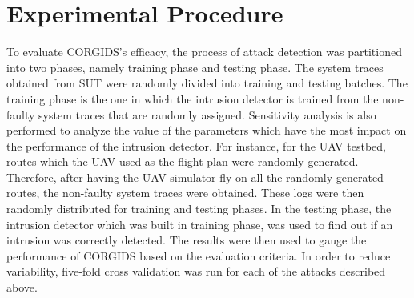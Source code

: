 \section{Experimental Procedure}
To evaluate CORGIDS's efficacy, the process of attack detection was partitioned  into two phases, namely training phase and testing phase. The system traces obtained from SUT were randomly divided into training and testing batches. The training phase is the one in which the intrusion detector is trained from the non-faulty system traces that are randomly assigned. Sensitivity analysis is also performed to analyze the value of the parameters which have the most impact on the performance of the intrusion detector. For instance, for the UAV testbed, routes which the UAV used as the flight plan were randomly generated. Therefore, after having the UAV simulator fly on all the randomly generated routes, the non-faulty system traces were obtained. These logs were then randomly distributed for training and testing phases. In the testing phase, the intrusion detector which was built in training phase, was used to find out if an intrusion was correctly detected. The results were then used to gauge the performance of CORGIDS based on the evaluation criteria. In order to reduce variability, five-fold cross validation was run for each of the attacks described above.



\endinput
=====================================================================
